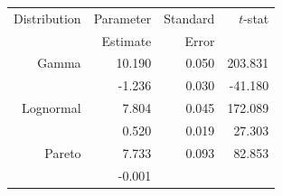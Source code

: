 \documentclass[]{book}
\theoremstyle{definition}
\theoremstyle{definition}
\theoremstyle{definition}
\theoremstyle{remark}
\begin{document}
\begin{longtable}[]{@{}rrrr@{}}
\toprule
Distribution & Parameter & Standard & \(t\)-stat\tabularnewline
\begin{minipage}[t]{0.24\columnwidth}\raggedleft\strut
\strut
\end{minipage} & \begin{minipage}[t]{0.24\columnwidth}\raggedleft\strut
Estimate\strut
\end{minipage} & \begin{minipage}[t]{0.24\columnwidth}\raggedleft\strut
Error\strut
\end{minipage} & \begin{minipage}[t]{0.24\columnwidth}\raggedleft\strut
\strut
\end{minipage}\tabularnewline
Gamma & 10.190 & 0.050 & 203.831\tabularnewline
\begin{minipage}[t]{0.24\columnwidth}\raggedleft\strut
\strut
\end{minipage} & \begin{minipage}[t]{0.24\columnwidth}\raggedleft\strut
-1.236\strut
\end{minipage} & \begin{minipage}[t]{0.24\columnwidth}\raggedleft\strut
0.030\strut
\end{minipage} & \begin{minipage}[t]{0.24\columnwidth}\raggedleft\strut
-41.180\strut
\end{minipage}\tabularnewline
Lognormal & 7.804 & 0.045 & 172.089\tabularnewline
\begin{minipage}[t]{0.24\columnwidth}\raggedleft\strut
\strut
\end{minipage} & \begin{minipage}[t]{0.24\columnwidth}\raggedleft\strut
0.520\strut
\end{minipage} & \begin{minipage}[t]{0.24\columnwidth}\raggedleft\strut
0.019\strut
\end{minipage} & \begin{minipage}[t]{0.24\columnwidth}\raggedleft\strut
27.303\strut
\end{minipage}\tabularnewline
Pareto & 7.733 & 0.093 & 82.853\tabularnewline
\begin{minipage}[t]{0.24\columnwidth}\raggedleft\strut
\strut
\end{minipage} & \begin{minipage}[t]{0.24\columnwidth}\raggedleft\strut
-0.001\strut
\end{minipage} & \begin{minipage}[t]{0.24\columnwidth}\raggedleft\strut

\end{minipage}
\end{longtable}
\end{document}
